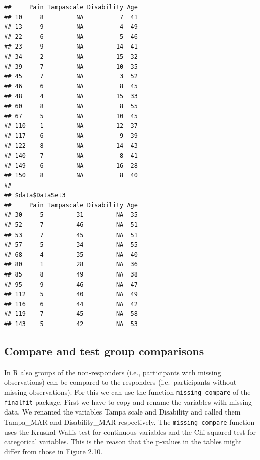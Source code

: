 \documentclass[
]{book}
\begin{document}
\begin{verbatim}
##     Pain Tampascale Disability Age
## 10     8         NA          7  41
## 13     9         NA          4  49
## 22     6         NA          5  46
## 23     9         NA         14  41
## 34     2         NA         15  32
## 39     7         NA         10  35
## 45     7         NA          3  52
## 46     6         NA          8  45
## 48     4         NA         15  33
## 60     8         NA          8  55
## 67     5         NA         10  45
## 110    1         NA         12  37
## 117    6         NA          9  39
## 122    8         NA         14  43
## 140    7         NA          8  41
## 149    6         NA         16  28
## 150    8         NA          8  40
## 
## $data$DataSet3
##     Pain Tampascale Disability Age
## 30     5         31         NA  35
## 52     7         46         NA  51
## 53     7         45         NA  51
## 57     5         34         NA  55
## 68     4         35         NA  40
## 80     1         28         NA  36
## 85     8         49         NA  38
## 95     9         46         NA  47
## 112    5         40         NA  49
## 116    6         44         NA  42
## 119    7         45         NA  58
## 143    5         42         NA  53
\end{verbatim}

\hypertarget{compare-and-test-group-comparisons-1}{%
\subsection{Compare and test group comparisons}\label{compare-and-test-group-comparisons-1}}

In R also groups of the non-responders (i.e., participants with missing observations) can be compared to the responders (i.e.~participants without missing observations). For this we can use the function \texttt{missing\_compare} of the \texttt{finalfit} package. First we have to copy and rename the variables with missing data. We renamed the variables Tampa scale and Disability and called them Tampa\_MAR and Disability\_MAR respectively. The \texttt{missing\_compare} function uses the Kruskal Wallis test for continuous variables and the Chi-squared test for categorical variables. This is the reason that the p-values in the tables might differ from those in Figure 2.10.
\end{document}
